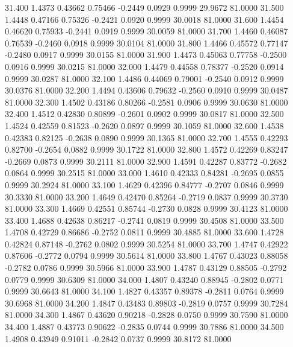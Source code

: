   31.400   1.4373   0.43662   0.75466  -0.2449   0.0929   0.9999  29.9672  81.0000
  31.500   1.4448   0.47166   0.75326  -0.2421   0.0920   0.9999  30.0018  81.0000
  31.600   1.4454   0.46620   0.75933  -0.2441   0.0919   0.9999  30.0059  81.0000
  31.700   1.4460   0.46087   0.76539  -0.2460   0.0918   0.9999  30.0104  81.0000
  31.800   1.4466   0.45572   0.77147  -0.2480   0.0917   0.9999  30.0155  81.0000
  31.900   1.4473   0.45063   0.77758  -0.2500   0.0916   0.9999  30.0215  81.0000
  32.000   1.4479   0.44558   0.78377  -0.2520   0.0914   0.9999  30.0287  81.0000
  32.100   1.4486   0.44069   0.79001  -0.2540   0.0912   0.9999  30.0376  81.0000
  32.200   1.4494   0.43606   0.79632  -0.2560   0.0910   0.9999  30.0487  81.0000
  32.300   1.4502   0.43186   0.80266  -0.2581   0.0906   0.9999  30.0630  81.0000
  32.400   1.4512   0.42830   0.80899  -0.2601   0.0902   0.9999  30.0817  81.0000
  32.500   1.4524   0.42559   0.81523  -0.2620   0.0897   0.9999  30.1059  81.0000
  32.600   1.4538   0.42383   0.82125  -0.2638   0.0890   0.9999  30.1365  81.0000
  32.700   1.4555   0.42293   0.82700  -0.2654   0.0882   0.9999  30.1722  81.0000
  32.800   1.4572   0.42269   0.83247  -0.2669   0.0873   0.9999  30.2111  81.0000
  32.900   1.4591   0.42287   0.83772  -0.2682   0.0864   0.9999  30.2515  81.0000
  33.000   1.4610   0.42333   0.84281  -0.2695   0.0855   0.9999  30.2924  81.0000
  33.100   1.4629   0.42396   0.84777  -0.2707   0.0846   0.9999  30.3330  81.0000
  33.200   1.4649   0.42470   0.85264  -0.2719   0.0837   0.9999  30.3730  81.0000
  33.300   1.4669   0.42551   0.85744  -0.2730   0.0828   0.9999  30.4123  81.0000
  33.400   1.4688   0.42638   0.86217  -0.2741   0.0819   0.9999  30.4508  81.0000
  33.500   1.4708   0.42729   0.86686  -0.2752   0.0811   0.9999  30.4885  81.0000
  33.600   1.4728   0.42824   0.87148  -0.2762   0.0802   0.9999  30.5254  81.0000
  33.700   1.4747   0.42922   0.87606  -0.2772   0.0794   0.9999  30.5614  81.0000
  33.800   1.4767   0.43023   0.88058  -0.2782   0.0786   0.9999  30.5966  81.0000
  33.900   1.4787   0.43129   0.88505  -0.2792   0.0779   0.9999  30.6309  81.0000
  34.000   1.4807   0.43240   0.88945  -0.2802   0.0771   0.9999  30.6643  81.0000
  34.100   1.4827   0.43357   0.89378  -0.2811   0.0764   0.9999  30.6968  81.0000
  34.200   1.4847   0.43483   0.89803  -0.2819   0.0757   0.9999  30.7284  81.0000
  34.300   1.4867   0.43620   0.90218  -0.2828   0.0750   0.9999  30.7590  81.0000
  34.400   1.4887   0.43773   0.90622  -0.2835   0.0744   0.9999  30.7886  81.0000
  34.500   1.4908   0.43949   0.91011  -0.2842   0.0737   0.9999  30.8172  81.0000
